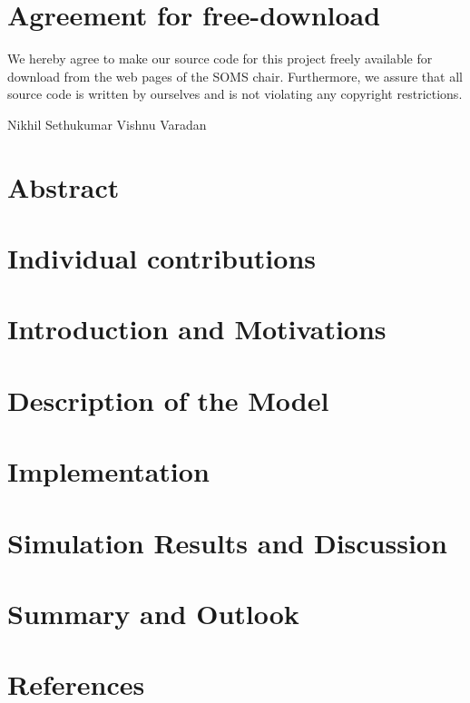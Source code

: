 \documentclass[11pt, letterpaper]{article}
\newcommand{\nameA}{Nikhil Sethukumar}
\newcommand{\nameB}{Vishnu Varadan}
\begin{document}
    

    \section*{Agreement for free-download}

    \bigskip
    
    \bigskip
    
    \large We hereby agree to make our source code for this project freely available for download from the web pages of the SOMS chair. Furthermore, we assure that all source code is written by ourselves and is not violating any copyright restrictions.

    \bigskip

     \nameA {} \nameB {}


   

    
\tableofcontents

\newpage


\section{Abstract}

\section{Individual contributions}

\section{Introduction and Motivations}

\section{Description of the Model}

\section{Implementation}

\section{Simulation Results and Discussion}

\section{Summary and Outlook}

\section{References}
\end{document}
